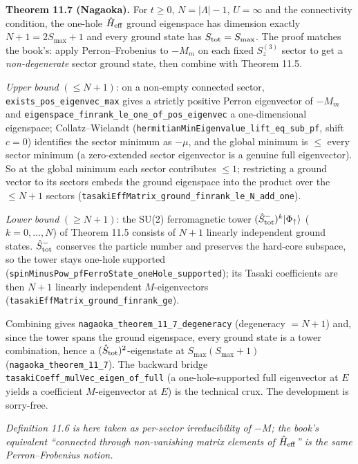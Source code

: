 \documentclass[a4paper,11pt]{article}
\begin{document}
\medskip
\noindent\textbf{Theorem 11.7 (Nagaoka).}
For \(t \ge 0\), \(N = |\Lambda|-1\), \(U = \infty\) and the connectivity
condition, the one-hole \(\hat H_{\rm eff}\) ground eigenspace has dimension
exactly \(N+1 = 2S_{\max}+1\) and every ground state has \(S_{\rm tot} = S_{\max}\).
The proof matches the book's: apply Perron--Frobenius to \(-M_m\) on each fixed
\(S_z^{(3)}\) sector to get a \emph{non-degenerate} sector ground state, then
combine with Theorem 11.5.

\emph{Upper bound} \((\le N+1)\): on a non-empty connected sector,
\texttt{exists\_pos\_eigenvec\_max} gives a strictly positive Perron eigenvector
of \(-M_m\) and \texttt{eigenspace\_finrank\_le\_one\_of\_pos\_eigenvec} a
one-dimensional eigenspace; Collatz--Wielandt
(\texttt{hermitianMinEigenvalue\_lift\_eq\_sub\_pf}, shift \(c=0\)) identifies the
sector minimum as \(-\mu\), and the global minimum is \(\le\) every sector minimum
(a zero-extended sector eigenvector is a genuine full eigenvector). So at the
global minimum each sector contributes \(\le 1\); restricting a ground vector to
its sectors embeds the ground eigenspace into the product over the \(\le N+1\)
sectors (\texttt{tasakiEffMatrix\_ground\_finrank\_le\_N\_add\_one}).

\emph{Lower bound} \((\ge N+1)\): the SU(2) ferromagnetic tower
\((\hat S^-_{\rm tot})^k|\Phi_\uparrow\rangle\) (\(k = 0,\dots,N\)) of Theorem 11.5
consists of \(N+1\) linearly independent ground states. \(\hat S^-_{\rm tot}\)
conserves the particle number and preserves the hard-core subspace, so the tower
stays one-hole supported (\texttt{spinMinusPow\_pfFerroState\_oneHole\_supported});
its Tasaki coefficients are then \(N+1\) linearly independent \(M\)-eigenvectors
(\texttt{tasakiEffMatrix\_ground\_finrank\_ge}).

Combining gives \texttt{nagaoka\_theorem\_11\_7\_degeneracy} (degeneracy
\(= N+1\)) and, since the tower spans the ground eigenspace, every ground state
is a tower combination, hence a \((\hat S_{\rm tot})^2\)-eigenstate at
\(S_{\max}(S_{\max}+1)\) (\texttt{nagaoka\_theorem\_11\_7}). The backward bridge
\texttt{tasakiCoeff\_mulVec\_eigen\_of\_full} (a one-hole-supported full
eigenvector at \(E\) yields a coefficient \(M\)-eigenvector at \(E\)) is the
technical crux. The development is sorry-free.

\medskip
\noindent\emph{Definition 11.6 is here taken as per-sector irreducibility of
\(-M\); the book's equivalent ``connected through non-vanishing matrix elements
of \(\hat H_{\rm eff}\)'' is the same Perron--Frobenius notion.}
\end{document}
